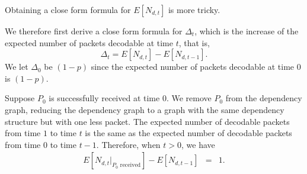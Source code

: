     Obtaining a close form formula for $E[N_{d,t}]$ is more tricky.
    
    We therefore first derive a close form formula for $\Delta_t$, which is 
    the increase of the expected number of packets decodable at time $t$,
    that is, 
    \begin{displaymath}
        \Delta_t = E[N_{d,t}] - E[N_{d,t-1}]. 
    \end{displaymath}
    We let $\Delta_0$ be $(1-p)$ since
    the expected number of packets decodable at time 0 is $(1-p)$.

    Suppose $P_0$ is successfully received at time $0$.  We remove $P_0$
    from the dependency graph, reducing the dependency graph to a 
    graph with the same dependency structure
    but with one less packet.  The expected number of decodable
    packets from time $1$ to time $t$ is the same as the expected
    number of decodable packets from time $0$ to time $t-1$.  Therefore,
    when $t>0$, we have
    \begin{eqnarray}
    \label{e:model:p0received}
    E[N_{d,t}|_{\textrm{$P_0$ received}}] - E[N_{d,t-1}] &=& 1.%
    \end{eqnarray}


